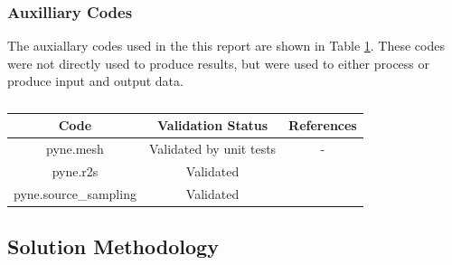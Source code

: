 \documentclass[12pt]{article}
\begin{document}
\subsubsection*{Auxilliary Codes}
The auxiallary codes used in the this report are shown in Table 
\ref{table:validation_aux}. These codes were not directly used to 
produce results, but were used to either process or produce input
and output data.
\begin{centering}
 \begin{table}[ht!]
  \begin{tabular}{c | c | c}
  \hline
  Code & Validation Status & References \\    
  \hline
  pyne.mesh & Validated by unit tests & - \\
  pyne.r2s & Validated & \cite{pyne_r2s} \\
  pyne.source\_sampling & Validated & \cite{pyne_r2s} \\
 \end{tabular}
 \caption{}
 \label{table:validation_aux}
 \end{table}
\end{centering}
\newpage
\subsection{Solution Methodology}
\label{section:method}
\end{document}
